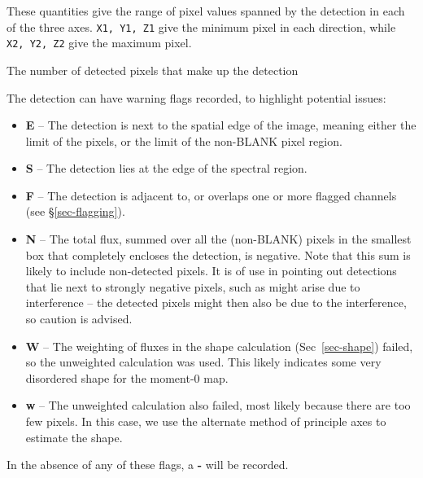 
These quantities give the range of pixel values spanned by the
detection in each of the three axes. \texttt{X1, Y1, Z1} give the
minimum pixel in each direction, while \texttt{X2, Y2, Z2} give the
maximum pixel.


The number of detected pixels that make up the detection 

\label{sec-flags}

The detection can have warning flags recorded, to highlight potential
issues:
\begin{itemize}
\item \textbf{E} -- The detection is next to the spatial edge of the
  image, meaning either the limit of the pixels, or the limit of the
  non-BLANK pixel region.
\item \textbf{S} -- The detection lies at the edge of the spectral
  region.
\item \textbf{F} -- The detection is adjacent to, or overlaps one or
  more flagged channels (see \S\ref{sec-flagging}).
\item \textbf{N} -- The total flux, summed over all the (non-BLANK)
  pixels in the smallest box that completely encloses the detection,
  is negative. Note that this sum is likely to include non-detected
  pixels. It is of use in pointing out detections that lie next to
  strongly negative pixels, such as might arise due to interference --
  the detected pixels might then also be due to the interference, so
  caution is advised.
\item \textbf{W} -- The weighting of fluxes in the shape calculation
  (Sec~\ref{sec-shape}) failed, so the unweighted calculation was
  used. This likely indicates some very disordered shape for the
  moment-0 map.
\item \textbf{w} -- The unweighted calculation also failed, most
  likely because there are too few pixels. In this case, we use the
  alternate method of principle axes to estimate the shape.
\end{itemize}
In the absence of any of these flags, a \textbf{-} will be recorded.


